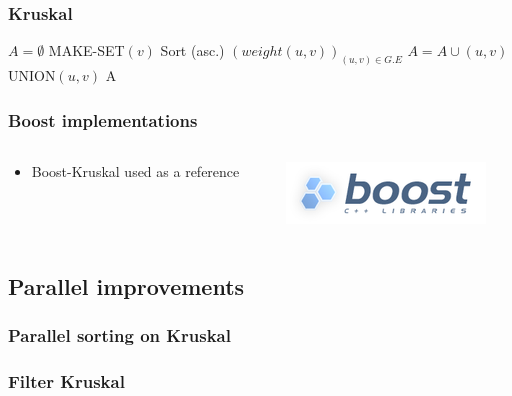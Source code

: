 \documentclass{beamer}
\begin{document}
\begin{frame}[fragile]
\frametitle{Kruskal}
\small
\begin{algorithm}[H]
\begin{algorithmic}[1]
\STATE $A = \emptyset$
\STATE MAKE-SET$(v)$
\ENDFOR
\STATE Sort (asc.) $\left(weight(u, v)\right)_{(u, v) \in G.E}$
\STATE $A = A \cup {(u, v)}$
\STATE UNION$(u, v)$
\ENDIF
\ENDFOR
\RETURN A
\end{algorithmic}
\end{algorithm}


\end{frame}

\begin{frame}
\frametitle{Boost implementations}

\begin{columns}
\begin{column}{.7\linewidth}
\begin{itemize}
\item Boost-Kruskal used as a reference
\end{itemize}
\end{column}

\begin{column}{.3\linewidth}
\includegraphics[width=\linewidth]{boost.png}
\end{column}
\end{columns}

\end{frame}


\subsection{Parallel improvements}

\begin{frame}
\frametitle{Parallel sorting on Kruskal}

\end{frame}

\begin{frame}

	\frametitle{Filter Kruskal}

\end{frame}
\end{document}
